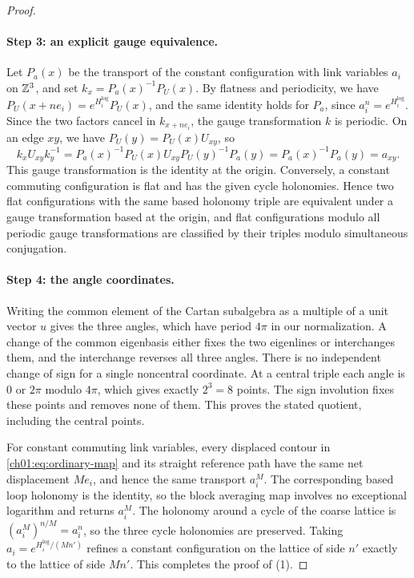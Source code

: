 \begin{proof}
\paragraph{Step 3: an explicit gauge equivalence.}
Let $P_a(x)$ be the transport of the constant configuration with link variables $a_i$ on $\mathbb Z^3$, and set $k_x=P_a(x)^{-1}P_U(x)$. By flatness and periodicity, we have $P_U(x+ne_i)=e^{H^{\log}_i}P_U(x)$, and the same identity holds for $P_a$, since $a_i^n=e^{H^{\log}_i}$. Since the two factors cancel in $k_{x+ne_i}$, the gauge transformation $k$ is periodic. On an edge $xy$, we have $P_U(y)=P_U(x)U_{xy}$, so
\[
 k_xU_{xy}k_y^{-1}=P_a(x)^{-1}P_U(x)U_{xy}P_U(y)^{-1}P_a(y)=P_a(x)^{-1}P_a(y)=a_{xy}.
\]
This gauge transformation is the identity at the origin. Conversely, a constant commuting configuration is flat and has the given cycle holonomies. Hence two flat configurations with the same based holonomy triple are equivalent under a gauge transformation based at the origin, and flat configurations modulo all periodic gauge transformations are classified by their triples modulo simultaneous conjugation.

\paragraph{Step 4: the angle coordinates.}
Writing the common element of the Cartan subalgebra as a multiple of a unit vector $u$ gives the three angles, which have period $4\pi$ in our normalization. A change of the common eigenbasis either fixes the two eigenlines or interchanges them, and the interchange reverses all three angles. There is no independent change of sign for a single noncentral coordinate. At a central triple each angle is $0$ or $2\pi$ modulo $4\pi$, which gives exactly $2^3=8$ points. The sign involution fixes these points and removes none of them. This proves the stated quotient, including the central points.

For constant commuting link variables, every displaced contour in \eqref{ch01:eq:ordinary-map} and its straight reference path have the same net displacement $Me_i$, and hence the same transport $a_i^M$. The corresponding based loop holonomy is the identity, so the block averaging map involves no exceptional logarithm and returns $a_i^M$. The holonomy around a cycle of the coarse lattice is $(a_i^M)^{n/M}=a_i^n$, so the three cycle holonomies are preserved. Taking $a_i=e^{H^{\log}_i/(Mn')}$ refines a constant configuration on the lattice of side $n'$ exactly to the lattice of side $Mn'$. This completes the proof of (1).


\end{proof}
